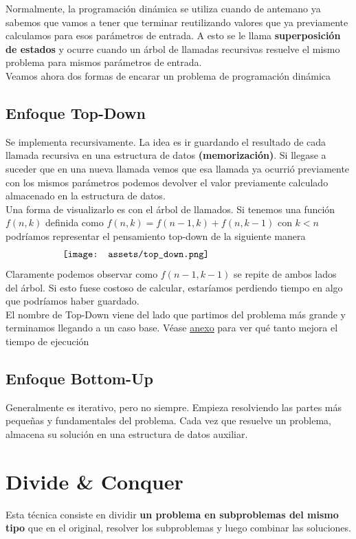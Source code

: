 \documentclass[10pt,a4paper]{article}
\begin{document}
Normalmente, la programación dinámica se utiliza cuando de antemano ya sabemos que vamos a tener que terminar reutilizando valores que ya previamente calculamos para esos parámetros de entrada. A esto se le llama \textbf{superposición de estados} y ocurre cuando un árbol de llamadas recursivas resuelve el mismo problema para mismos parámetros de entrada. \\

Veamos ahora dos formas de encarar un problema de programación dinámica 

\subsection*{Enfoque Top-Down} 
Se implementa recursivamente. La idea es ir guardando el resultado de cada llamada recursiva en una estructura de datos \textbf{(memorización)}. Si llegase a suceder que en una nueva llamada vemos que esa llamada ya ocurrió previamente con los mismos parámetros podemos devolver el valor previamente calculado almacenado en la estructura de datos.  \\ 

Una forma de visualizarlo es con el árbol de llamados. Si tenemos una función $f(n, k)$ definida como $f(n, k) = f(n-1, k) + f(n, k-1)$ con $k<n$ podríamos representar el pensamiento top-down de la siguiente manera
\[\begin{minipage}[b]{0.7\textwidth}
    \texttt{[image: assets/top\_down.png]}
\end{minipage}\]
Claramente podemos observar como $f(n-1, k-1)$ se repite de ambos lados del árbol. Si esto fuese costoso de calcular, estaríamos perdiendo tiempo en algo que podríamos haber guardado. \\

El nombre de Top-Down viene del lado que partimos del problema más grande y terminamos llegando a un caso base.
Véase \hyperref[subsec:top_down_programacion_dinamica]{\underline{anexo}} para ver qué tanto mejora el tiempo de ejecución
\subsection*{Enfoque Bottom-Up}
Generalmente es iterativo, pero no siempre. Empieza resolviendo las partes más pequeñas y fundamentales del problema. Cada vez que resuelve un problema, almacena su solución en una estructura de datos auxiliar.
\section*{Divide \& Conquer}
Esta técnica consiste en dividir \textbf{un problema en subproblemas
 del mismo tipo} que en el original, resolver los subproblemas y luego combinar las soluciones. \\
\end{document}
